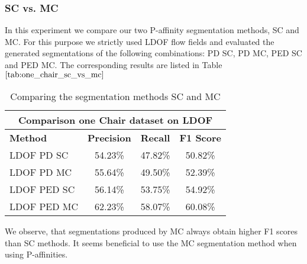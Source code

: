 \subsubsection{SC vs. MC}
In this experiment we compare our two P-affinity segmentation methods, SC and MC. For this purpose we strictly used LDOF flow fields and evaluated the generated segmentations of the following combinations: PD SC, PD MC, PED SC and PED MC. The corresponding results are listed in Table $\ref{tab:one_chair_sc_vs_mc}$
\begin{table}[H]
\centering
\begin{tabular}{|l|c|c|c|}
\hline
\multicolumn{4}{|c|}{Comparison one Chair dataset on LDOF}                        \\ \hline
\textbf{Method} & \textbf{Precision} & \textbf{Recall} & \textbf{F1 Score}  \\ \hline
LDOF PD SC & 54.23\% & 47.82\% & 50.82\% \\ \hline
LDOF PD MC & 55.64\% & 49.50\% & 52.39\% \\ \hline
LDOF PED SC & 56.14\% & 53.75\% & 54.92\% \\ \hline
LDOF PED MC & 62.23\% & 58.07\% & 60.08\% \\ \hline              
\end{tabular}
\caption[SC vs. MC]{Comparing the segmentation methods SC and MC} 
\label{tab:one_chair_sc_vs_mc}
\end{table}
We observe, that segmentations produced by MC always obtain higher F1 scores than SC methods. It seems beneficial to use the MC segmentation method when using P-affinities.

